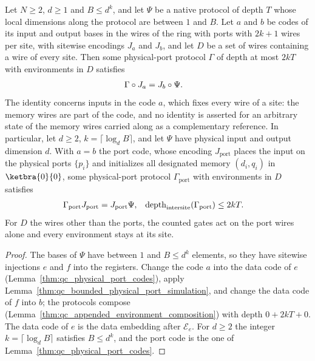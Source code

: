 \begin{lemma}
    \label{lem:qc_physical_register_encoding}
    \leanok
    Let $N\ge2$, $d\ge1$ and $B\le d^k$, and let $\Psi$ be a native protocol of depth $T$ whose
    local dimensions along the protocol are between $1$ and $B$. Let $a$ and $b$ be codes of its
    input and output bases in the wires of the ring with ports with $2k+1$ wires per site, with
    sitewise encodings $J_a$ and $J_b$, and let $D$ be a set of wires containing a wire of every
    site. Then some physical-port protocol $\Gamma$ of depth at most $2kT$ with environments in
    $D$ satisfies
    \begin{align}
        \Gamma\circ J_a & =J_b\circ\Psi.\notag
    \end{align}
    The identity concerns inputs in the code $a$, which fixes every wire of a site: the memory
    wires are part of the code, and no identity is asserted for an arbitrary state of the memory
    wires carried along as a complementary reference. In particular, let $d\ge2$,
    $k=\lceil\log_d B\rceil$, and let $\Psi$ have physical input and output dimension $d$. With
    $a=b$ the port code, whose encoding $J_{\mathrm{port}}$ places the input on the physical ports
    $\{p_i\}$ and initializes all designated memory $(d_i,q_i)$ in $\ketbra{0}{0}$, some
    physical-port protocol $\Gamma_{\mathrm{port}}$ with environments in $D$ satisfies
    \begin{align}
        \Gamma_{\mathrm{port}} J_{\mathrm{port}}
         & = J_{\mathrm{port}}\Psi,
         & \operatorname{depth}_{\mathrm{intersite}}(\Gamma_{\mathrm{port}})
         & \leq 2kT.\notag
    \end{align}
    For $D$ the wires other than the ports, the counted gates act on the port wires alone and
    every environment stays at its site.
\end{lemma}
\begin{proof}
    \leanok
    The bases of $\Psi$ have between $1$ and $B\le d^k$ elements, so they have sitewise
    injections $e$ and $f$ into the registers. Change the code $a$ into the data code of $e$
    (Lemma~\ref{thm:qc_physical_port_codes}), apply
    Lemma~\ref{thm:qc_bounded_physical_port_simulation}, and change the data code of $f$ into $b$;
    the protocols compose (Lemma~\ref{thm:qc_appended_environment_composition}) with depth
    $0+2kT+0$. The data code of $e$ is the data embedding after $\mathcal E_e$.
    For $d\ge2$ the integer $k=\lceil\log_d B\rceil$ satisfies $B\le d^k$, and the port code is
    the one of Lemma~\ref{thm:qc_physical_port_codes}.
\end{proof}

